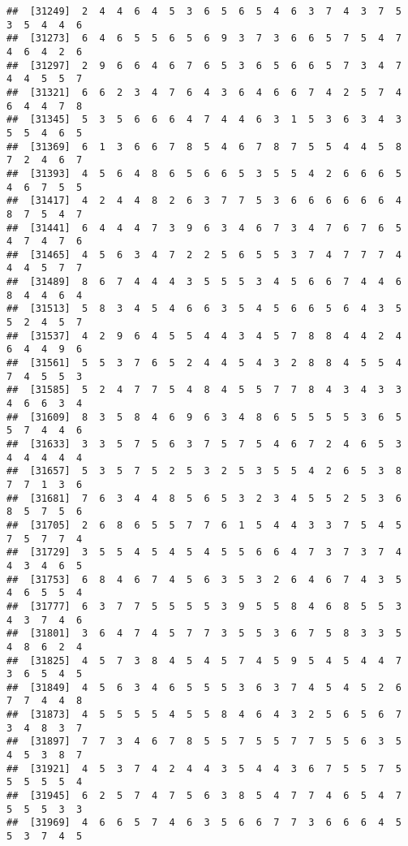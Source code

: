 \documentclass[
]{book}
\begin{document}
\begin{verbatim}
##  [31249]  2  4  4  6  4  5  3  6  5  6  5  4  6  3  7  4  3  7  5  3  5  4  4  6
##  [31273]  6  4  6  5  5  6  5  6  9  3  7  3  6  6  5  7  5  4  7  4  6  4  2  6
##  [31297]  2  9  6  6  4  6  7  6  5  3  6  5  6  6  5  7  3  4  7  4  4  5  5  7
##  [31321]  6  6  2  3  4  7  6  4  3  6  4  6  6  7  4  2  5  7  4  6  4  4  7  8
##  [31345]  5  3  5  6  6  6  4  7  4  4  6  3  1  5  3  6  3  4  3  5  5  4  6  5
##  [31369]  6  1  3  6  6  7  8  5  4  6  7  8  7  5  5  4  4  5  8  7  2  4  6  7
##  [31393]  4  5  6  4  8  6  5  6  6  5  3  5  5  4  2  6  6  6  5  4  6  7  5  5
##  [31417]  4  2  4  4  8  2  6  3  7  7  5  3  6  6  6  6  6  6  4  8  7  5  4  7
##  [31441]  6  4  4  4  7  3  9  6  3  4  6  7  3  4  7  6  7  6  5  4  7  4  7  6
##  [31465]  4  5  6  3  4  7  2  2  5  6  5  5  3  7  4  7  7  7  4  4  4  5  7  7
##  [31489]  8  6  7  4  4  4  3  5  5  5  3  4  5  6  6  7  4  4  6  8  4  4  6  4
##  [31513]  5  8  3  4  5  4  6  6  3  5  4  5  6  6  5  6  4  3  5  5  2  4  5  7
##  [31537]  4  2  9  6  4  5  5  4  4  3  4  5  7  8  8  4  4  2  4  6  4  4  9  6
##  [31561]  5  5  3  7  6  5  2  4  4  5  4  3  2  8  8  4  5  5  4  7  4  5  5  3
##  [31585]  5  2  4  7  7  5  4  8  4  5  5  7  7  8  4  3  4  3  3  4  6  6  3  4
##  [31609]  8  3  5  8  4  6  9  6  3  4  8  6  5  5  5  5  3  6  5  5  7  4  4  6
##  [31633]  3  3  5  7  5  6  3  7  5  7  5  4  6  7  2  4  6  5  3  4  4  4  4  4
##  [31657]  5  3  5  7  5  2  5  3  2  5  3  5  5  4  2  6  5  3  8  7  7  1  3  6
##  [31681]  7  6  3  4  4  8  5  6  5  3  2  3  4  5  5  2  5  3  6  8  5  7  5  6
##  [31705]  2  6  8  6  5  5  7  7  6  1  5  4  4  3  3  7  5  4  5  7  5  7  7  4
##  [31729]  3  5  5  4  5  4  5  4  5  5  6  6  4  7  3  7  3  7  4  4  3  4  6  5
##  [31753]  6  8  4  6  7  4  5  6  3  5  3  2  6  4  6  7  4  3  5  4  6  5  5  4
##  [31777]  6  3  7  7  5  5  5  5  3  9  5  5  8  4  6  8  5  5  3  4  3  7  4  6
##  [31801]  3  6  4  7  4  5  7  7  3  5  5  3  6  7  5  8  3  3  5  4  8  6  2  4
##  [31825]  4  5  7  3  8  4  5  4  5  7  4  5  9  5  4  5  4  4  7  3  6  5  4  5
##  [31849]  4  5  6  3  4  6  5  5  5  3  6  3  7  4  5  4  5  2  6  7  7  4  4  8
##  [31873]  4  5  5  5  5  4  5  5  8  4  6  4  3  2  5  6  5  6  7  3  4  8  3  7
##  [31897]  7  7  3  4  6  7  8  5  5  7  5  5  7  7  5  5  6  3  5  4  5  3  8  7
##  [31921]  4  5  3  7  4  2  4  4  3  5  4  4  3  6  7  5  5  7  5  5  5  5  5  4
##  [31945]  6  2  5  7  4  7  5  6  3  8  5  4  7  7  4  6  5  4  7  5  5  5  3  3
##  [31969]  4  6  6  5  7  4  6  3  5  6  6  7  7  3  6  6  6  4  5  5  3  7  4  5

\end{verbatim}
\end{document}
